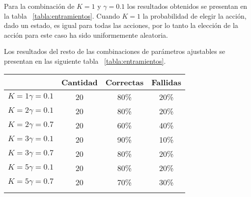 Para la combinaci\'on de $K = 1$ y $ \gamma = 0.1 $ los resultados obtenidos se presentan en la tabla ~\ref{tabla:entramientos}. Cuando $K = 1$ la probabilidad de elegir la acci\'on, dado un estado, es igual para todas las acciones, por lo tanto la elección de la acción para este caso ha sido uniformemente aleatoria. 


Los resultados del resto de las combinaciones de par\'ametros ajustables se presentan en las siguiente tabla ~\ref{tabla:entramientos}.

\begin{tabular}{|c|c|c|c|}
\hline 
& Cantidad & Correctas & Fallidas \\ 
\hline 
$K = 1  \gamma = 0.1$ & 20 & 80\% & 20\% \\ 
\hline 
$K = 2  \gamma = 0.1$ & 20 & 80\% & 20\% \\ 
\hline 
$K = 2  \gamma = 0.7$ & 20 & 60\% & 40\% \\ 
\hline 
$K = 3  \gamma = 0.1$ & 20 & 90\% & 10\% \\ 
\hline 
$K = 3  \gamma = 0.7$ & 20 & 80\% & 20\% \\ 
\hline 
$K = 5  \gamma = 0.1$ & 20 & 80\% & 20\% \\ 
\hline  
$K = 5  \gamma = 0.7$ & 20 & 70\% & 30\% \\ 
\hline 
\label{tabla:entramientos}
\end{tabular} 
%
%
%
